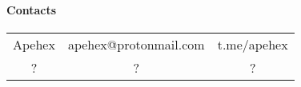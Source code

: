 \paragraph{Contacts} \label{sec:contacts}

\begin{table}[h!t]
\begin{tabular}{|C|C|C|}
\hline
{}
 &  &  \\
\hline
Apehex & apehex@protonmail.com & t.me/apehex \\
\hline
? & ? & ? \\
\hline
\end{tabular}
\end{table}
